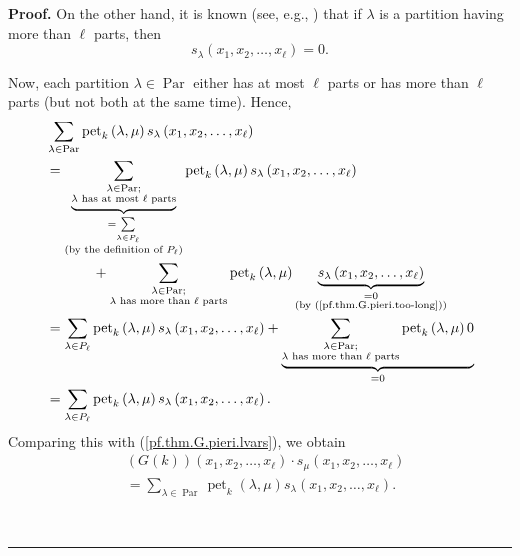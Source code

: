 \documentclass[numbers=enddot,12pt,final,onecolumn,notitlepage]{scrartcl}%
\theoremstyle{definition}
\newenvironment{proof}[1][Proof]{\noindent\textbf{#1.} }{\ \rule{0.5em}{0.5em}}
\let\sumnonlimits\sum
\renewcommand{\sum}{\sumnonlimits\limits}
\newenvironment{verlong}{}{}
\begin{document}
\begin{verlong}
\begin{proof}
On the other hand, it is known (see, e.g., \cite[Exercise 2.3.8(b)]{GriRei})
that if $\lambda$ is a partition having more than $\ell$ parts, then%
\begin{equation}
s_{\lambda}\left(  x_{1},x_{2},\ldots,x_{\ell}\right)  =0.
\label{pf.thm.G.pieri.too-long}%
\end{equation}


Now, each partition $\lambda\in\operatorname*{Par}$ either has at most $\ell$
parts or has more than $\ell$ parts (but not both at the same time). Hence,%
\begin{align*}
&  \sum_{\lambda\in\operatorname*{Par}}\operatorname*{pet}\nolimits_{k}\left(
\lambda,\mu\right)  s_{\lambda}\left(  x_{1},x_{2},\ldots,x_{\ell}\right) \\
&  =\underbrace{\sum_{\substack{\lambda\in\operatorname*{Par};\\\lambda\text{
has at most }\ell\text{ parts}}}}_{\substack{=\sum_{\lambda\in P_{\ell}%
}\\\text{(by the definition of }P_{\ell}\text{)}}}\operatorname*{pet}%
\nolimits_{k}\left(  \lambda,\mu\right)  s_{\lambda}\left(  x_{1},x_{2}%
,\ldots,x_{\ell}\right) \\
&  \ \ \ \ \ \ \ \ \ \ +\sum_{\substack{\lambda\in\operatorname*{Par}%
;\\\lambda\text{ has more than }\ell\text{ parts}}}\operatorname*{pet}%
\nolimits_{k}\left(  \lambda,\mu\right)  \underbrace{s_{\lambda}\left(
x_{1},x_{2},\ldots,x_{\ell}\right)  }_{\substack{=0\\\text{(by
(\ref{pf.thm.G.pieri.too-long}))}}}\\
&  =\sum_{\lambda\in P_{\ell}}\operatorname*{pet}\nolimits_{k}\left(
\lambda,\mu\right)  s_{\lambda}\left(  x_{1},x_{2},\ldots,x_{\ell}\right)
+\underbrace{\sum_{\substack{\lambda\in\operatorname*{Par};\\\lambda\text{ has
more than }\ell\text{ parts}}}\operatorname*{pet}\nolimits_{k}\left(
\lambda,\mu\right)  0}_{=0}\\
&  =\sum_{\lambda\in P_{\ell}}\operatorname*{pet}\nolimits_{k}\left(
\lambda,\mu\right)  s_{\lambda}\left(  x_{1},x_{2},\ldots,x_{\ell}\right)  .
\end{align*}
Comparing this with (\ref{pf.thm.G.pieri.lvars}), we obtain%
\begin{align}
&  \left(  G\left(  k\right)  \right)  \left(  x_{1},x_{2},\ldots,x_{\ell
}\right)  \cdot s_{\mu}\left(  x_{1},x_{2},\ldots,x_{\ell}\right) \nonumber\\
&  =\sum_{\lambda\in\operatorname*{Par}}\operatorname*{pet}\nolimits_{k}%
\left(  \lambda,\mu\right)  s_{\lambda}\left(  x_{1},x_{2},\ldots,x_{\ell
}\right)  . \label{pf.thm.G.pieri.lvars-Par}%
\end{align}



\end{proof}
\end{verlong}
\end{document}
